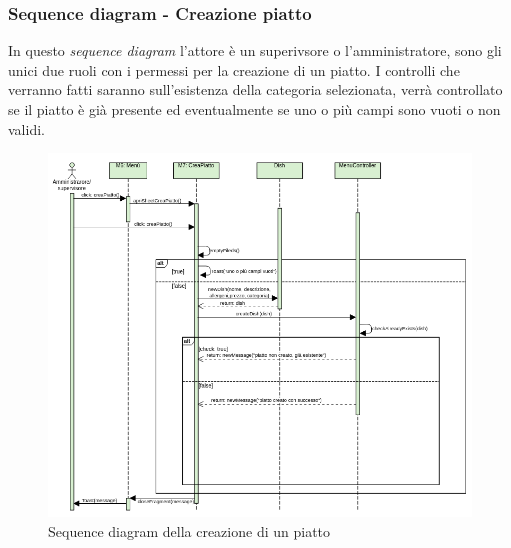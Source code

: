 \subsubsection{Sequence diagram - Creazione piatto}
In questo \textit{sequence diagram} l'attore è un superivsore o l'amministratore, sono gli unici due ruoli con i permessi per la creazione di un piatto. I controlli che verranno fatti saranno sull'esistenza della categoria selezionata, verrà controllato se il piatto è già presente ed eventualmente se uno o più campi sono vuoti o non validi.
\begin{figure}[H]
  \centering
  \includegraphics[scale=0.8]{img/sequence/creazionePiatto_sequence_diagram.png}
  \caption{Sequence diagram della creazione di un piatto}
\end{figure}  
\newpage
